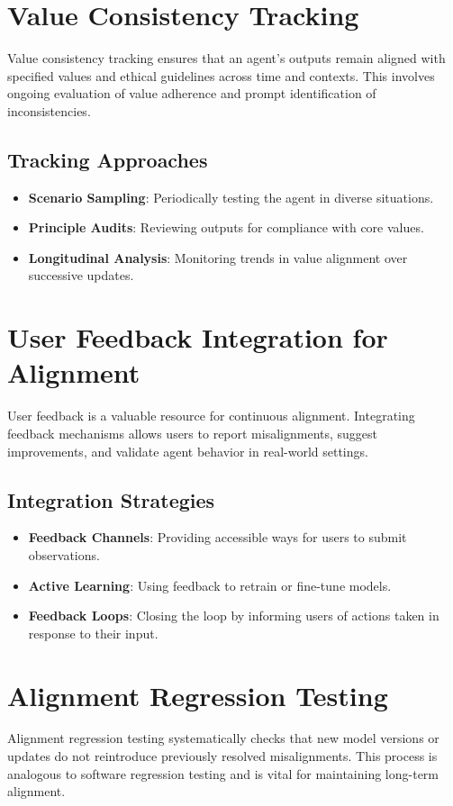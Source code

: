 \begin{TNtwocol}
\section{Value Consistency Tracking}
Value consistency tracking ensures that an agent’s outputs remain aligned with specified values and ethical guidelines across time and contexts. This involves ongoing evaluation of value adherence and prompt identification of inconsistencies.

\subsection{Tracking Approaches}
\begin{itemize}
    \item \textbf{Scenario Sampling}: Periodically testing the agent in diverse situations.
    \item \textbf{Principle Audits}: Reviewing outputs for compliance with core values.
    \item \textbf{Longitudinal Analysis}: Monitoring trends in value alignment over successive updates.
\end{itemize}

\section{User Feedback Integration for Alignment}
User feedback is a valuable resource for continuous alignment. Integrating feedback mechanisms allows users to report misalignments, suggest improvements, and validate agent behavior in real-world settings.

\subsection{Integration Strategies}
\begin{itemize}
    \item \textbf{Feedback Channels}: Providing accessible ways for users to submit observations.
    \item \textbf{Active Learning}: Using feedback to retrain or fine-tune models.
    \item \textbf{Feedback Loops}: Closing the loop by informing users of actions taken in response to their input.
\end{itemize}

\section{Alignment Regression Testing}
Alignment regression testing systematically checks that new model versions or updates do not reintroduce previously resolved misalignments. This process is analogous to software regression testing and is vital for maintaining long-term alignment.


\end{TNtwocol}
